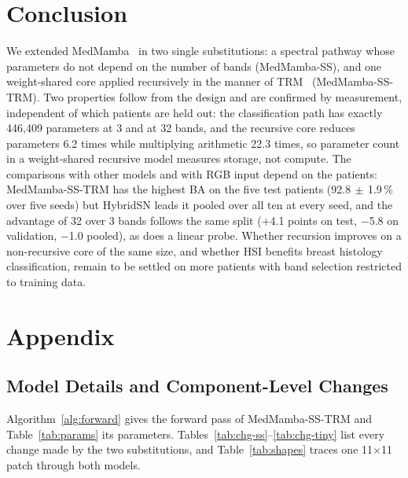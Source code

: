 \documentclass{svproc}
\newcommand{\ms}{\ensuremath{\,\pm\,}}   %
\begin{document}
\section{Conclusion}
We extended MedMamba~\cite{medmamba} in two single substitutions: a spectral pathway whose parameters do not depend on the number of bands (MedMamba-SS), and one weight-shared core applied recursively in the manner of TRM~\cite{trm} (MedMamba-SS-TRM). Two properties follow from the design and are confirmed by measurement, independent of which patients are held out: the classification path has exactly 446,409 parameters at 3 and at 32 bands, and the recursive core reduces parameters 6.2 times while multiplying arithmetic 22.3 times, so parameter count in a weight-shared recursive model measures storage, not compute. The comparisons with other models and with RGB input depend on the patients: MedMamba-SS-TRM has the highest BA on the five test patients (92.8\ms1.9\,\% over five seeds) but HybridSN leads it pooled over all ten at every seed, and the advantage of 32 over 3 bands follows the same split (+4.1 points on test, $-$5.8 on validation, $-$1.0 pooled), as does a linear probe. Whether recursion improves on a non-recursive core of the same size, and whether HSI benefits breast histology classification, remain to be settled on more patients with band selection restricted to training data.

\section*{Appendix}
\setcounter{subsection}{0}
\renewcommand{\thesubsection}{A.\arabic{subsection}}

\subsection{Model Details and Component-Level Changes}
Algorithm~\ref{alg:forward} gives the forward pass of MedMamba-SS-TRM and Table~\ref{tab:params} its parameters. Tables~\ref{tab:chg-ss}--\ref{tab:chg-tiny} list every change made by the two substitutions, and Table~\ref{tab:shapes} traces one 11$\times$11 patch through both models.
\end{document}
